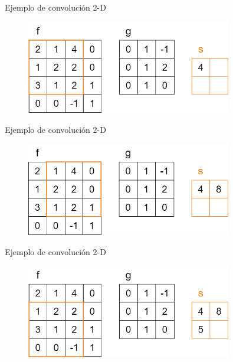 \begin{frame}{Ejemplo de convolución 2-D}
\begin{figure}
    \centering
    \includegraphics[width=0.8\textwidth]{figures/Tema 2/Convolucion2D_2.png}
\end{figure}
\end{frame}

\begin{frame}{Ejemplo de convolución 2-D}
\begin{figure}
    \centering
    \includegraphics[width=0.8\textwidth]{figures/Tema 2/Convolucion2D_3.png}
\end{figure}
\end{frame}

\begin{frame}{Ejemplo de convolución 2-D}
\begin{figure}
    \centering
    \includegraphics[width=0.8\textwidth]{figures/Tema 2/Convolucion2D_4.png}
\end{figure}
\end{frame}

